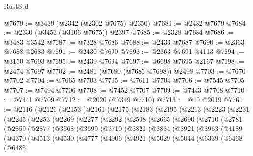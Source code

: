 \begin{lexlean}{RustStd}
\begin{coremodule}
@7679 := @3439 (@2342 (@2302 @7675) @2350)
@7680 := @2482 @7679
@7684 := @2330 (@3453 (@3106 @7675)) @2397
@7685 := @2328 @7684
@7686 := @3483 @3542
@7687 := @7328 @7686
@7688 := @2433 @7687
@7690 := @2363 @7688 @2683
@7691 := @2430 @7690
@7693 := @2363 @7691 @4113
@7694 := @3150 @7693
@7695 := @2439 @7694
@7697 := @6698 @7695 @2167
@7698 := @2474 @7697
@7702 := @2481 (@7680 (@7685 @7698)) @2498
@7703 := @7670 @7702
@7704 := @7665 @7703
@7705 := @7611 @7704
@7706 := @7545 @7705
@7707 := @7494 @7706
@7708 := @7452 @7707
@7709 := @7443 @7708
@7710 := @7441 @7709
@7712 := @2020 (@7349 @7710)
@7713 := @10 @2019
@7761 := @2116
    (@2126
      (@2153
        (@2161
          (@2175
            (@2183
              (@2195
                (@2203
                  (@2223
                    (@2231
                      (@2245
                        (@2253
                          (@2269
                            (@2277
                              (@2292
                                (@2508
                                  (@2665
                                    (@2690
                                      (@2710
                                        (@2781
                                          (@2859
                                            (@2877
                                              (@3568
                                                (@3699
                                                  (@3710
                                                    (@3821
                                                      (@3834
                                                        (@3921
                                                          (@3963
                                                            (@4189
                                                              (@4370
                                                                (@4513
                                                                  (@4530
                                                                    (@4777
                                                                      (@4906
                                                                        (@4921
                                                                          (@5029
                                                                            (@5044
                                                                              (@6339
                                                                                (@6468
                                                                                  (@6485

\end{coremodule}
\end{lexlean}
